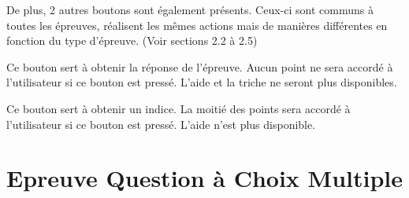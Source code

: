 \documentclass[11pt]{scrreprt}
\begin{document}
    De plus, 2 autres boutons sont également présents. Ceux-ci sont communs à toutes les épreuves, réalisent les mêmes actions mais de manières différentes en fonction du type d'épreuve. (Voir sections 2.2 à 2.5)
    \begin{description}[style=nextline]
        \item[Bouton de triche]Ce bouton sert à obtenir la réponse de l'épreuve. Aucun point ne sera accordé à l'utilisateur si ce bouton est pressé. L'aide et la triche ne seront plus disponibles.
        \item[Bouton d'aide]Ce bouton sert à obtenir un indice. La moitié des points sera accordé à l'utilisateur si ce bouton est pressé. L'aide n'est plus disponible.
    \end{description}

    \section{Epreuve Question à Choix Multiple}
\end{document}
